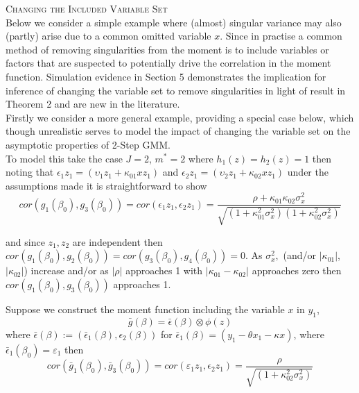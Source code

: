\documentclass[11pt, fleqn]{article}
\begin{document}
\textsc{Changing the Included Variable Set}\\



   Below we consider  a simple example where (almost) singular variance may also (partly) arise due to a common omitted variable $x$. Since in practise a common method of removing singularities from the moment is to include variables or factors that are suspected to potentially drive the correlation in the moment function. Simulation evidence in Section 5 demonstrates the implication for inference of changing the variable set to remove singularities  in light of result in Theorem 2 and are new in the literature.\\

   Firstly we consider a more general example, providing a special case below, which though unrealistic serves to model the impact of changing the variable set on the asymptotic properties of 2-Step GMM.\\
   To model this take the  case $J=2$, $m^*=2$ where $h_1(z)=h_2(z)=1$  then noting that $\epsilon_1 z_1=(\upsilon_1z_1+\kappa_{01} xz_1)$ and $\epsilon_2 z_1=(\upsilon_2 z_1 +\kappa_{02} x z_1)$ under the assumptions made it is straightforward to show
 \begin{equation}  cor(g_1(\beta_0),g_3(\beta_0))=cor(\epsilon_1z_1,\epsilon_2z_1)=\frac{\rho+\kappa_{01}\kappa_{02}\sigma^2_x}{\sqrt{(1+\kappa_{01}^2\sigma^2_x)(1+\kappa_{02}^2\sigma^2_x)}} \end{equation}

  and since  $z_1,z_2$ are independent then $cor(g_1(\beta_0),g_2(\beta_0))= cor(g_3(\beta_0),g_4(\beta_0))=0$.
 As $\sigma^2_x,$ (and/or $|\kappa_{01}|$,$|\kappa_{02}|$) increase  and/or as $|\rho|$ approaches 1  with $|\kappa_{01}-\kappa_{02}|$ approaches zero then $cor(g_1(\beta_0),g_3(\beta_0))$ approaches 1.

Suppose we construct the moment function
 including the variable $x$ in $y_1$,
 \begin{equation} \bar{g}(\beta)=\bar{\epsilon}(\beta)\otimes \phi(z) \end{equation}
 where $\bar{\epsilon}(\beta):=(\bar{\epsilon}_1(\beta),\epsilon_2(\beta))$ for $\bar{\epsilon}_1(\beta)=(y_1-\theta x_1-\kappa x)$, where $\bar{\epsilon}_1(\beta_0)=\varepsilon_1$ then
\begin{equation} cor(\bar{g}_1(\beta_0),\bar{g}_3(\beta_0))=cor(\varepsilon_1z_1,\epsilon_2z_1)=\frac{\rho}{\sqrt{(1+\kappa_{02}^2\sigma^2_x)}} \end{equation}
\end{document}
